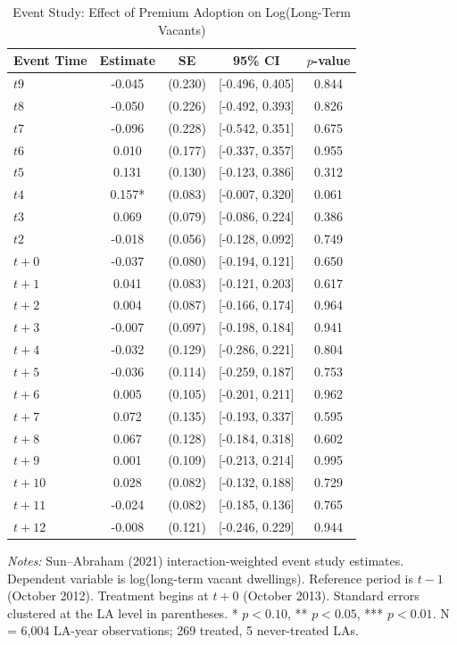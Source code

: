 \begin{table}[H]
\centering
\caption{Event Study: Effect of Premium Adoption on Log(Long-Term Vacants)}
\begin{threeparttable}
\begin{tabular}{lcccc}
\toprule
Event Time & Estimate & SE & 95\% CI & $p$-value \\
\midrule
$t  9$ & -0.045 & (0.230) & [-0.496, 0.405] & 0.844 \\
$t  8$ & -0.050 & (0.226) & [-0.492, 0.393] & 0.826 \\
$t  7$ & -0.096 & (0.228) & [-0.542, 0.351] & 0.675 \\
$t  6$ & 0.010 & (0.177) & [-0.337, 0.357] & 0.955 \\
$t  5$ & 0.131 & (0.130) & [-0.123, 0.386] & 0.312 \\
$t  4$ & 0.157* & (0.083) & [-0.007, 0.320] & 0.061 \\
$t  3$ & 0.069 & (0.079) & [-0.086, 0.224] & 0.386 \\
$t  2$ & -0.018 & (0.056) & [-0.128, 0.092] & 0.749 \\
$t + 0$ & -0.037 & (0.080) & [-0.194, 0.121] & 0.650 \\
$t + 1$ & 0.041 & (0.083) & [-0.121, 0.203] & 0.617 \\
$t + 2$ & 0.004 & (0.087) & [-0.166, 0.174] & 0.964 \\
$t + 3$ & -0.007 & (0.097) & [-0.198, 0.184] & 0.941 \\
$t + 4$ & -0.032 & (0.129) & [-0.286, 0.221] & 0.804 \\
$t + 5$ & -0.036 & (0.114) & [-0.259, 0.187] & 0.753 \\
$t + 6$ & 0.005 & (0.105) & [-0.201, 0.211] & 0.962 \\
$t + 7$ & 0.072 & (0.135) & [-0.193, 0.337] & 0.595 \\
$t + 8$ & 0.067 & (0.128) & [-0.184, 0.318] & 0.602 \\
$t + 9$ & 0.001 & (0.109) & [-0.213, 0.214] & 0.995 \\
$t + 10$ & 0.028 & (0.082) & [-0.132, 0.188] & 0.729 \\
$t + 11$ & -0.024 & (0.082) & [-0.185, 0.136] & 0.765 \\
$t + 12$ & -0.008 & (0.121) & [-0.246, 0.229] & 0.944 \\
\bottomrule
\end{tabular}
\begin{tablenotes}[flushleft]
\small
\item \emph{Notes:} Sun--Abraham (2021) interaction-weighted event study estimates. Dependent variable is log(long-term vacant dwellings). Reference period is $t-1$ (October 2012). Treatment begins at $t+0$ (October 2013). Standard errors clustered at the LA level in parentheses. * $p<0.10$, ** $p<0.05$, *** $p<0.01$. N = 6,004 LA-year observations; 269 treated, 5 never-treated LAs.
\end{tablenotes}
\end{threeparttable}
\label{tab:eventstudy}
\end{table}

